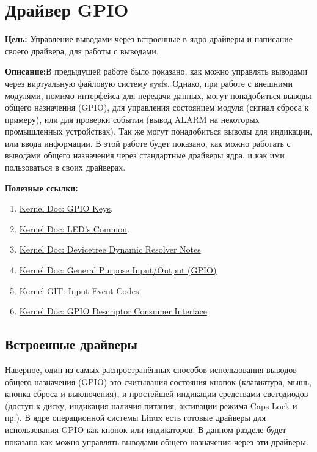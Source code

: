 \chapter{Драйвер GPIO}
\textbf{Цель:} Управление выводами через встроенные в ядро драйверы и написание своего драйвера, для работы с выводами.

\vspace{5mm}
\textbf{Описание:}В предыдущей работе было показано, как можно управлять выводами через виртуальную файловую систему sysfs. Однако, при работе с внешними модулями, помимо интерфейса для передачи данных, могут понадобиться выводы общего назначения (GPIO), для управления состоянием модуля (сигнал сброса к примеру), или для проверки события (вывод ALARM на некоторых промышленных устройствах). Так же могут понадобиться выводы для индикации, или ввода информации. В этой работе будет показано, как можно работать с выводами общего назначения через стандартные драйверы ядра, и как ими пользоваться в своих драйверах. 

\vspace{5mm}
\textbf{Полезные ссылки:}
\begin{enumerate}
	\item \href{https://www.kernel.org/doc/Documentation/devicetree/bindings/input/gpio-keys.txt}{Kernel Doc: GPIO Keys}.
	\item \href{https://www.kernel.org/doc/Documentation/devicetree/bindings/leds/common.yaml}{Kernel Doc: LED's Common}.
	\item \href{https://docs.kernel.org/devicetree/dynamic-resolution-notes.html}{Kernel Doc: Devicetree Dynamic Resolver Notes}
	\item \href{https://www.kernel.org/doc/html/v4.15/driver-api/gpio.html}{Kernel Doc: General Purpose Input/Output (GPIO)}
	\item  \href{https://git.kernel.org/pub/scm/linux/kernel/git/torvalds/linux.git/tree/include/uapi/linux/input-event-codes.h}{Kernel GIT: Input Event Codes} \label{link:event_code}
	\item \href{https://www.kernel.org/doc/Documentation/gpio/consumer.txt}{Kernel Doc: GPIO Descriptor Consumer Interface}	
\end{enumerate}

\section{Встроенные драйверы}
Наверное, один из самых распространённых способов использования выводов общего назначения (GPIO) это считывания состояния кнопок (клавиатура, мышь, кнопка сброса и выключения), и простейшей индикации средствами светодиодов (доступ к диску,  индикация наличия питания, активации режима Caps Lock и пр.). В ядре операционной системы Linux есть готовые драйверы для использования GPIO как кнопок или индикаторов. В данном разделе будет показано как можно управлять выводами общего назначения через эти драйверы.

